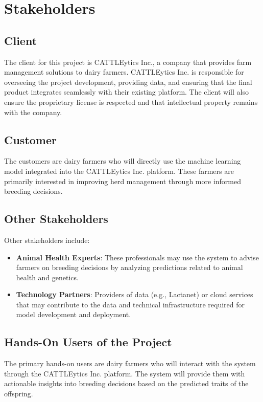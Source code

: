 \documentclass[12pt]{article}
\begin{document}
\section{Stakeholders}

\subsection{Client}
The client for this project is CATTLEytics Inc., a company that provides farm 
management solutions to dairy farmers. CATTLEytics Inc. is responsible for 
overseeing the project development, providing data, and ensuring that the final 
product integrates seamlessly with their existing platform. The client will 
also ensure the proprietary license is respected and that intellectual property 
remains with the company.

\subsection{Customer}
The customers are dairy farmers who will directly use the machine learning 
model integrated into the CATTLEytics Inc. platform. These farmers are 
primarily interested in improving herd management through more informed 
breeding decisions.

\subsection{Other Stakeholders}
Other stakeholders include:

\begin{itemize}
    \item \textbf{Animal Health Experts}: These professionals may use the 
    system to advise farmers on breeding decisions by analyzing predictions 
    related to animal health and genetics.
    \item \textbf{Technology Partners}: Providers of data (e.g., Lactanet) or 
    cloud services that may contribute to the data and technical infrastructure 
    required for model development and deployment.
\end{itemize}

\subsection{Hands-On Users of the Project}
The primary hands-on users are dairy farmers who will interact with the system 
through the CATTLEytics Inc. platform. The system will provide them with 
actionable insights into breeding decisions based on the predicted traits of 
the offspring.
\end{document}
